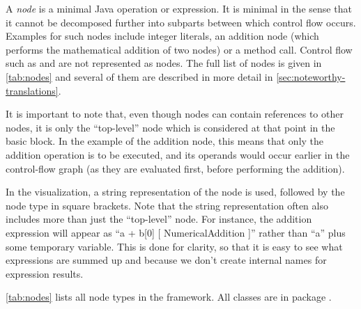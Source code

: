 \begin{definition}[Nodes]
    \label{def:node}
    A \emph{node} is a minimal Java operation or expression.  It is
    minimal in the sense that it cannot be decomposed further into
    subparts between which control flow occurs. Examples for such
    nodes include integer literals, an addition node (which performs
    the mathematical addition of two nodes) or a method call.  Control
    flow such as  and  are not represented as
    nodes.  The full list of nodes is given in \autoref{tab:nodes} and
    several of them are described in more detail in
    \autoref{sec:noteworthy-translations}.

    It is important to note that, even though nodes can contain
    references to other nodes, it is only the ``top-level'' node which
    is considered at that point in the basic block. In the example of
    the addition node, this means that only the addition operation is
    to be executed, and its operands would occur earlier in the
    control-flow graph (as they are evaluated first, before performing
    the addition).
\end{definition}

In the visualization, a string representation of the node is used,
followed by the node type in square brackets. Note that the string
representation often also includes more than just the ``top-level''
node. For instance, the addition expression  will
appear as ``a + b[0] [ NumericalAddition ]'' rather than ``a'' plus
some temporary variable.  This is done for clarity, so that it is easy
to see what expressions are summed up and because we don't create
internal names for expression results.

\autoref{tab:nodes} lists all node types in the framework.
All classes are in package .

\newcommand{\nodetype}[1]{\code{#1}}

